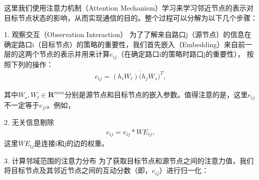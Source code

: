 这里我们使用注意力机制（Attention Mechanism）学习来学习邻近节点的表示对目标节点状态的影响，从而实现通信的目的。整个过程可以分解为以下几个步骤：

1. 观察交互（Observation Interaction）
为了了解来自路口j（源节点）的信息在确定路口i（目标节点）的策略的重要性，我们首先嵌入（Embedding）来自前一层的这两个节点的表示并用来计算$e_{ij}$（在确定路口i的策略时路口j的重要性），
按照下列的操作：
\begin{align}
\label{eq:eij}
  e_{ij}=(h_i W_t) \dot (h_j W_s)^{T},
\end{align}

其中$W_s, W_t \in \mathbf{R}^{mxn}$分别是源节点和目标节点的嵌入参数。值得注意的是，这里$e_{ij}$不一定等于$e_{ji}$。例如，

2. 无关信息剔除
\begin{align}
  \label{eq:mul_phase}
  e_{ij} = e_{ij} * WE_{ij},
\end{align}
这里$WE_{ij}$是连接i和j的边的权重。

3. 计算邻域范围的注意力分布
为了获取目标节点和源节点之间的注意力值，我们将目标节点及其邻近节点之间的互动分数（即，$e_{ij}$）进行归一化：



